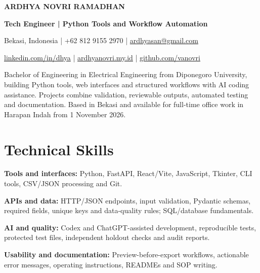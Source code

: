 \documentclass[11pt,a4paper]{article}
\begin{document}
\begin{center}
{\fontsize{20}{23}\selectfont\bfseries ARDHYA NOVRI RAMADHAN}\par
\vspace{3pt}
{\bfseries Tech Engineer | Python Tools and Workflow Automation}\par
Bekasi, Indonesia | +62 812 9155 2970 | \href{mailto:ardhyasan@gmail.com}{ardhyasan@gmail.com}\par
\href{https://www.linkedin.com/in/dhya/}{linkedin.com/in/dhya} | \href{https://ardhyanovri.my.id}{ardhyanovri.my.id} | \href{https://github.com/vanovri}{github.com/vanovri}
\end{center}
\raggedright
Bachelor of Engineering in Electrical Engineering from Diponegoro University, building Python tools, web interfaces and structured workflows with AI coding assistance. Projects combine validation, reviewable outputs, automated testing and documentation. Based in Bekasi and available for full-time office work in Harapan Indah from 1 November 2026.\par
\section{Technical Skills}
\textbf{Tools and interfaces:} Python, FastAPI, React/Vite, JavaScript, Tkinter, CLI tools, CSV/JSON processing and Git.\par
\textbf{APIs and data:} HTTP/JSON endpoints, input validation, Pydantic schemas, required fields, unique keys and data-quality rules; SQL/database fundamentals.\par
\textbf{AI and quality:} Codex and ChatGPT-assisted development, reproducible tests, protected test files, independent holdout checks and audit reports.\par
\textbf{Usability and documentation:} Preview-before-export workflows, actionable error messages, operating instructions, READMEs and SOP writing.\par
\end{document}
